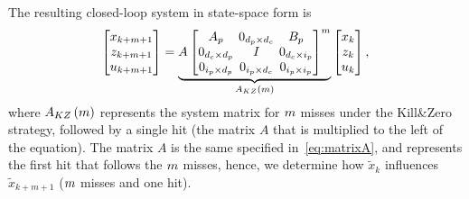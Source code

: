 The resulting closed-loop system in state-space form is
%
\begin{equation} 
    \setlength\arraycolsep{2pt}
    \label{eq:KZ}
    \begin{bmatrix}
        x_{k+\nummisses+1} \\
        z_{k+\nummisses+1} \\
        u_{k+\nummisses+1}
    \end{bmatrix} = 
    \underbrace{ A \begin{bmatrix}
        A_p                                         & 0_{\numstatesplant \times \numstatesctl}  & B_p \\
        0_{\numstatesctl \times \numstatesplant}    & I                                         & 0_{\numstatesctl \times \numinputplant} \\
        0_{\numinputplant \times \numstatesplant}   & 0_{\numinputplant \times \numstatesctl}   & 0_{\numinputplant \times \numinputplant}
    \end{bmatrix}^{\nummisses}}_{A_{KZ}\funof{\nummisses}}
    \begin{bmatrix}
        x_{k} \\
        z_{k} \\
        u_{k}
    \end{bmatrix},
\end{equation}
%
where $A_{KZ}\left(m\right)$ represents the system matrix for
$m$ misses under the Kill\&Zero strategy, followed by
a single hit (the matrix $A$ that is multiplied to the left of
the equation).  The matrix $A$ is the same specified 
in~\eqref{eq:matrixA}, and represents the first hit that
follows the $m$ misses, hence, we determine how
$\tilde{x}_k$ influences $\tilde{x}_{k+m+1}$ ($m$ misses
and one hit).


